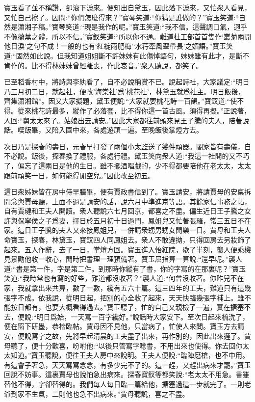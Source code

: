 \begin{parag}
    寶玉看了並不稱讚，卻滾下淚來。便知出自黛玉，因此落下淚來，又怕衆人看見，又忙自己擦了。因問:“你們怎麼得來？”寶琴笑道:“你猜是誰做的？”寶玉笑道:“自然是瀟湘子稿。”寶琴笑道:“現是我作的呢。”寶玉笑道:“我不信。這聲調口氣，迥乎不像蘅蕪之體，所以不信。”寶釵笑道:“所以你不通。難道杜工部首首隻作‘叢菊兩開他日淚’之句不成！一般的也有‘紅綻雨肥梅’‘水荇牽風翠帶長’之媚語。”寶玉笑道:“固然如此說。但我知道姐姐斷不許妹妹有此傷悼語句，妹妹雖有此才，是斷不肯作的。比不得林妹妹曾經離喪，作此哀音。”衆人聽說，都笑了。
\end{parag}


\begin{parag}
    已至稻香村中，將詩與李紈看了，自不必說稱賞不已。說起詩社，大家議定:“明日乃三月初二日，就起社，便改'海棠社'爲'桃花社'，林黛玉就爲社主。明日飯後，齊集瀟湘館”。因又大家擬題，黛玉便說:“大家就要桃花詩一百韻。”寶釵道:“使不得。從來桃花詩最多，縱作了必落套，比不得你這一首古風。須得再擬。”正說著，人回:“舅太太來了。姑娘出去請安。”因此大家都往前頭來見王子騰的夫人，陪著說話。喫飯畢，又陪入園中來，各處遊頑一遍。至晚飯後掌燈方去。
\end{parag}


\begin{parag}
    次日乃是探春的壽日，元春早打發了兩個小太監送了幾件頑器。閤家皆有壽儀，自不必說。飯後，探春換了禮服，各處行禮。黛玉笑向衆人道:“我這一社開的又不巧了，偏忘了這兩日是他的生日。雖不擺酒唱戲的，少不得都要陪他在老太太，太太跟前頑笑一日，如何能得閒空兒。”因此改至初五。
\end{parag}


\begin{parag}
    這日衆姊妹皆在房中侍早膳畢，便有賈政書信到了。寶玉請安，將請賈母的安稟拆開念與賈母聽，上面不過是請安的話，說六月中準進京等語。其餘家信事務之帖，自有賈璉和王夫人開讀。衆人聽說六七月回京，都喜之不盡。偏生近日王子騰之女許與保寧侯之子爲妻，擇日於五月初十日過門，鳳姐兒又忙著張羅，常三五日不在家。這日王子騰的夫人又來接鳳姐兒，一併請衆甥男甥女閒樂一日。賈母和王夫人命寶玉，探春，林黛玉，寶釵四人同鳳姐去。衆人不敢違拗，只得回房去另妝飾了起來。五人作辭，去了一日，掌燈方回。寶玉進入怡紅院，歇了半刻，襲人便乘機見景勸他收一收心，閒時把書理一理預備著。寶玉屈指算一算說:“還早呢。”襲人道:“書是第一件，字是第二件。到那時你縱有了書，你的字寫的在那裏呢？”寶玉笑道:“我時常也有寫的好些，難道都沒收著？”襲人道:“何曾沒收著。你昨兒不在家，我就拿出來共算，數了一數，纔有五六十篇。這三四年的工夫，難道只有這幾張字不成。依我說，從明日起，把別的心全收了起來，天天快臨幾張字補上。雖不能按日都有，也要大概看得過去。”寶玉聽了，忙的自己又親檢了一遍，實在搪塞不去，便說:“明日爲始，一天寫一百字纔好。”說話時大家安下。至次日起來梳洗了，便在窗下研墨，恭楷臨帖。賈母因不見他，只當病了，忙使人來問。寶玉方去請安，便說寫字之故，先將早起清晨的工夫盡了出來，再作別的，因此出來遲了。賈母聽了，便十分歡喜，吩咐他:“以後只管寫字唸書，不用出來也使得。你去回你太太知道。”寶玉聽說，便往王夫人房中來說明。王夫人便說:“臨陣磨槍，也不中用。有這會子著急，天天寫寫念念，有多少完不了的。這一趕，又趕出病來才罷。”寶玉回說不妨事。這裏賈母也說怕急出病來。探春寶釵等都笑說:“老太太不用急。書雖替他不得，字卻替得的。我們每人每日臨一篇給他，搪塞過這一步就完了。一則老爺到家不生氣，二則他也急不出病來。”賈母聽說，喜之不盡。
\end{parag}


